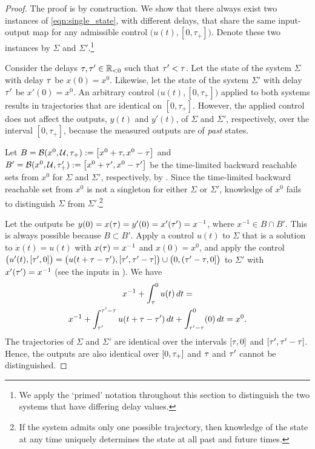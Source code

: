 \documentclass[letterpaper,10pt,conference]{ieeeconf}
\theoremstyle{definition}
\begin{document}
\begin{proof}
The proof is by construction.
%
We show that there always exist two instances of \cref{eqn:single_state}, with different delays, that share the same input-output map for any admissible control $\big(u(t), [0, \tau_{+}]\big)$.
%
Denote these two instances by $\Sigma$ and $\Sigma'$.\footnote{We apply the `primed' notation throughout this section to distinguish the two systems that have differing delay values.}
\smallskip

Consider the delays $\tau, \tau' \in \mathbb{R}_{<0}$ such that $\tau' < \tau$. 
%
Let the state of the system $\Sigma$ with delay $\tau$ be $x(0) = x^{0}$. Likewise, let the state of the system $\Sigma'$ with delay $\tau'$ be $x'(0) = x^{0}$. 
%
An arbitrary control $\big(u(t), [0, \tau_{+}]\big)$ applied to both systems results in trajectories that are identical on $[0, \tau_{+}]$.
%
However, the applied control does not affect the outputs, $y(t)$ and $y'(t)$, of $\Sigma$ and $\Sigma'$, respectively, over the interval $[0, \tau_{+}]$, because the measured outputs are of \emph{past} states.

Let $B = \mathcal{B}(x^{0}, \mathcal{U}, \tau_{+}) := \left[x^{0} + \tau, x^{0} - \tau\right]$ and $B' = \mathcal{B}(x^{0}, \mathcal{U}, \tau'_{+}) := \left[x^{0} + \tau', x^{0} - \tau'\right]$ be the time-limited backward reachable sets from $x^{0}$ for $\Sigma$ and $\Sigma'$, respectively, by .
%
Since the time-limited backward reachable set from $x^{0}$ is not a singleton for either $\Sigma$ or $\Sigma'$, knowledge of $x^{0}$ fails to distinguish $\Sigma$ from $\Sigma'$.\footnote{If the system admits only one possible trajectory, then knowledge of the state at any time uniquely determines the state at all past and future times.}

Let the outputs be $y(0) = x(\tau) = y'(0) = x'(\tau') = x^{-1}$, where $x^{-1} \in B \cap B'$.
%
This is always possible because $B \subset B'$.
%
Apply a control $u(t)$ to $\Sigma$ that is a solution to $\dot{x}(t) = u(t)$ with $x(\tau) = x^{-1}$ and $x(0) = x^{0}$, and apply the control $\big(u'(t), [\tau', 0]\big) =   \big(u(t + \tau - \tau'), [\tau', \tau' - \tau]\big) \cup \big(0, (\tau' - \tau, 0]\big)$ to $\Sigma'$ with $x'(\tau') = x^{-1}$ (see the inputs in ).
%
We have
%
\begin{multline}
x^{-1} + \int^{0}_{\tau} u(t)\,dt = \\
x^{-1} + \int^{\tau' - \tau}_{\tau'} u(t + \tau - \tau')\,dt + \int^{0}_{\tau' - \tau} (0)\,dt = x^{0}.
\end{multline}
%
The trajectories of $\Sigma$ and $\Sigma'$ are identical over the intervals $[\tau, 0]$ and $[\tau', \tau' - \tau]$. Hence, the outputs are also identical over $[0, \tau_{+}]$ and $\tau$ and $\tau'$ cannot be distinguished.
\medskip


\end{proof}
\end{document}
